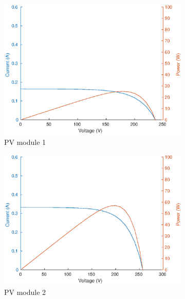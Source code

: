 \documentclass[conference]{IEEEtran}
\begin{document}
\begin{figure}
     \centering
    \begin{subfigure}[b]{0.3\linewidth}
        \centering
        \includegraphics[width=\linewidth]{fig/Module_1.eps}
        \caption{PV module 1}
     \end{subfigure}
     \begin{subfigure}[b]{0.3\linewidth}
        \centering
        \includegraphics[width=\linewidth]{fig/Module_2.eps}
        \caption{PV module 2}
     \end{subfigure}
     \begin{subfigure}[b]{0.3\linewidth}
        \centering

\end{subfigure}
\end{figure}
\end{document}
